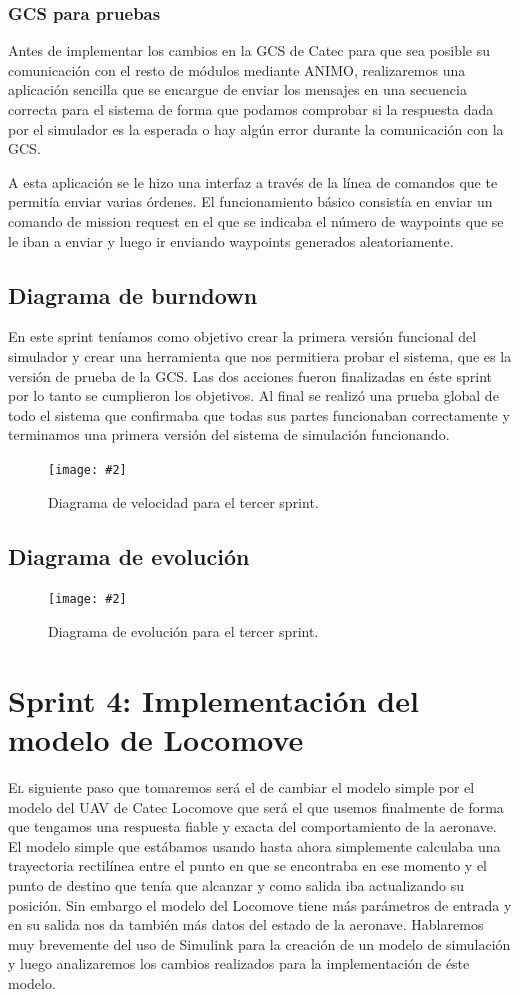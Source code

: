 \documentclass[12pt,a4paper,spanish]{book} %
\newcommand{\imgCentradaGrande}[3]{
\begin{figure}[H]
\begin{center}
\texttt{[image: \#2]}
\caption{#3}
\label{#1}
\end{center}
\end{figure}
}
\begin{document}
\subsubsection{GCS para pruebas}

Antes de implementar los cambios en la GCS de Catec para que sea posible su comunicación con el resto de módulos mediante ANIMO, realizaremos una aplicación sencilla que se encargue de enviar los mensajes en una secuencia correcta para el sistema de forma que podamos comprobar si la respuesta dada por el simulador es la esperada o hay algún error durante la comunicación con la GCS.

A esta aplicación se le hizo una interfaz a través de la línea de comandos que te permitía enviar varias órdenes. El funcionamiento básico consistía en enviar un comando de mission request en el que se indicaba el número de waypoints que se le iban a enviar y luego ir enviando waypoints generados aleatoriamente.

\subsection{Diagrama de burndown}

En este sprint teníamos como objetivo crear la primera versión funcional del simulador y crear una herramienta que nos permitiera probar el sistema, que es la versión de prueba de la GCS. Las dos acciones fueron finalizadas en éste sprint por lo tanto se cumplieron los objetivos. Al final se realizó una prueba global de todo el sistema que confirmaba que todas sus partes funcionaban correctamente y terminamos una primera versión del sistema de simulación funcionando.

\imgCentradaGrande{fig.4.13}{img/diagvelocidad3.eps}{Diagrama de velocidad para el tercer sprint.}

\subsection{Diagrama de evolución}
\imgCentradaGrande{fig.4.14}{img/diagevolucion3.eps}{Diagrama de evolución para el tercer sprint.}


\newpage
\section{Sprint 4: Implementación del modelo de Locomove}

\lettrine{E}{l} siguiente paso que tomaremos será el de cambiar el modelo simple por el modelo del UAV de Catec Locomove que será el que usemos finalmente de forma que tengamos una respuesta fiable y exacta del comportamiento de la aeronave. El modelo simple que estábamos usando hasta ahora simplemente calculaba una trayectoria rectilínea entre el punto en que se encontraba en ese momento y el punto de destino que tenía que alcanzar y como salida iba actualizando su posición. Sin embargo el modelo del Locomove tiene más parámetros de entrada y en su salida nos da también más datos del estado de la aeronave. Hablaremos muy brevemente del uso de Simulink para la creación de un modelo de simulación y luego analizaremos los cambios realizados para la implementación de éste modelo.
\end{document}
